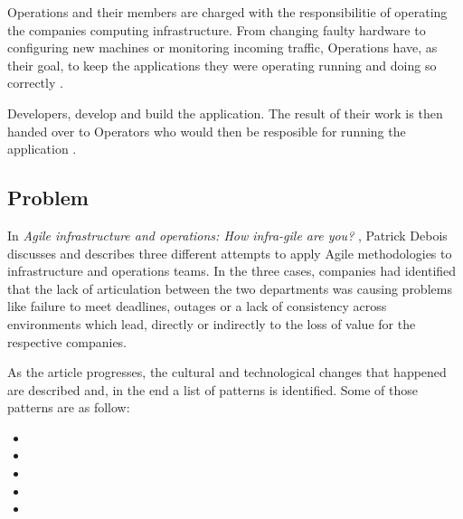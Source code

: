       Operations and their members are charged with the responsibilitie of operating the companies computing infrastructure. From changing faulty hardware to configuring new machines or monitoring incoming traffic, Operations have, as their goal, to keep the applications they were operating running and doing so correctly \cite{Bass}.

      Developers, develop and build the application. The result of their work is then handed over to Operators who would then be resposible for running the application \cite{Huttermann2012}.

      \subsection{Problem} \label{chap:stateoftheheart:sec:devops:sec:problem}

      In \textit{Agile infrastructure and operations: How infra-gile are you?} \cite{Debois2008}, Patrick Debois discusses and describes three different attempts to apply Agile methodologies to infrastructure and operations teams. In the three cases, companies had identified that the lack of articulation between the two departments was causing problems like failure to meet deadlines, outages or a lack of consistency across environments which lead, directly or indirectly to the loss of value for the respective companies.

      As the article progresses, the cultural and technological changes that happened are described and, in the end a list of patterns is identified. Some of those patterns are as follow:

      \begin{itemize}
        \item {}
        \item {}
        \item {}
        \item {}
        \item {}
      \end{itemize}

